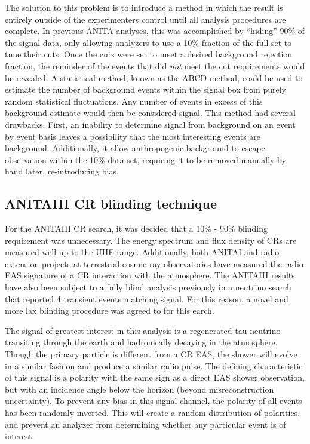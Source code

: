 		The solution to this problem is to introduce a method in which the result is entirely outside of the experimenters control until all analysis procedures are complete.  In previous ANITA analyses, this was accomplished by ``hiding'' 90\% of the signal data, only allowing analyzers to use a 10\% fraction of the full set to tune their cuts.  Once the cuts were set to meet a desired background rejection fraction, the reminder of the events that did \textit{not} meet the cut requirements would be revealed.  A statistical method, known as the ABCD method, could be used to estimate the number of background events within the signal box from purely random statistical fluctuations.  Any number of events in excess of this background estimate would then be considered signal.  This method had several drawbacks. First, an inability to determine signal from background on an event by event basis leaves a possibility that the most interesting events are background.  Additionally, it allow anthropogenic background to escape observation within the 10\% data set, requiring it to be removed manually by hand later, re-introducing bias.
		
	\subsection{ANITAIII CR blinding technique}
		For the ANITAIII CR search, it was decided that a 10\% - 90\% blinding requirement was unnecessary.  The energy spectrum and flux density of CRs are measured well up to the UHE range.  Additionally, both ANITAI and radio extension projects at terrestrial cosmic ray observatories have measured the radio EAS signature of a CR interaction with the atmosphere.  The ANITAIII results have also been subject to a fully blind analysis previously in a neutrino search that reported 4 transient events matching signal.  For this reason, a novel and more lax blinding procedure was agreed to for this earch.

		The signal of greatest interest in this analysis is a regenerated tau neutrino transiting through the earth and hadronically decaying in the atmosphere.  Though the primary particle is different from a CR EAS, the shower will evolve in a similar fashion and produce a similar radio pulse.  The defining characteristic of this signal is a polarity with the same sign as a direct EAS shower observation, but with an incidence angle below the horizon (beyond misreconstruction uncertainty).  To prevent any bias in this signal channel, the polarity of all events has been randomly inverted.  This will create a random distribution of polarities, and prevent an analyzer from determining whether any particular event is of interest.
		
